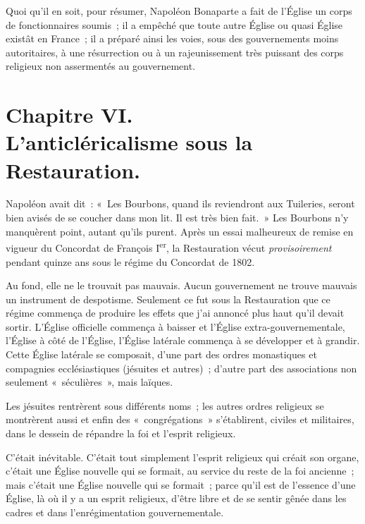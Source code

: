 \documentclass[french,twoside]{book} %
\begin{document}
\noindent Quoi qu’il en soit, pour résumer, Napoléon Bonaparte a fait de l’Église un corps de fonctionnaires soumis ; il a empêché que toute autre Église ou quasi Église existât en France ; il a préparé ainsi les voies, sous des gouvernements moins autoritaires, à une résurrection ou à un rajeunissement très puissant des corps religieux non assermentés au gouvernement.
 \section[{Chapitre VI. L’anticléricalisme sous la Restauration.}]{Chapitre VI.\\
L’anticléricalisme sous la Restauration.}\renewcommand{\leftmark}{Chapitre VI.\\
L’anticléricalisme sous la Restauration.}

\noindent Napoléon avait dit : « Les Bourbons, quand ils reviendront aux Tuileries, seront bien avisés de se coucher dans mon lit. Il est très bien fait. » Les Bourbons n’y manquèrent point, autant qu’ils purent. Après un essai malheureux de remise en vigueur du Concordat de François I\textsuperscript{er}, la Restauration vécut {\itshape provisoirement} pendant quinze ans sous le régime du Concordat de 1802.\par
Au fond, elle ne le trouvait pas mauvais. Aucun gouvernement ne trouve mauvais un instrument de despotisme. Seulement ce fut sous la Restauration que ce régime commença de produire les effets que j’ai annoncé plus haut qu’il devait sortir. L’Église officielle commença à baisser et l’Église extra-gouvernementale, l’Église à côté de l’Église, l’Église latérale commença à se développer et à grandir. Cette Église latérale se composait, d’une part des ordres monastiques et compagnies ecclésiastiques  (jésuites et autres) ; d’autre part des associations non seulement « séculières », mais laïques.\par
Les jésuites rentrèrent sous différents noms ; les autres ordres religieux se montrèrent aussi et enfin des « congrégations » s’établirent, civiles et militaires, dans le dessein de répandre la foi et l’esprit religieux.\par
C’était inévitable. C’était tout simplement l’esprit religieux qui créait son organe, c’était une Église nouvelle qui se formait, au service du reste de la foi ancienne ; mais c’était une Église nouvelle qui se formait ; parce qu’il est de l’essence d’une Église, là où il y a un esprit religieux, d’être libre et de se sentir gênée dans les cadres et dans l’enrégimentation gouvernementale.\par
\end{document}
